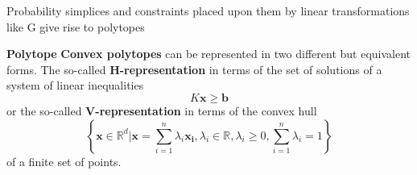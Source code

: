 \begin{frame}
Probability simplices and constraints placed upon them by linear transformations like G give rise to polytopes
\begin{block}{\textbf{Polytope}}
\textbf{Convex polytopes} can be represented in two different but equivalent forms. The so-called \textbf{H-representation} in terms of the set of solutions of a system of linear inequalities
$$K\mathbf{x} \geq \mathbf{b}$$
or the so-called \textbf{V-representation} in terms of the convex hull
$$\left\{ \mathbf{x} \in \mathbb{R}^d | \mathbf{x} = \sum_{i=1}^n \lambda_i \mathbf{x_i}, \lambda_i \in \mathbb{R}, \lambda_i \geq 0, \sum_{i=1}^n \lambda_i = 1  \right\} $$
of a finite set of points.
\end{block}
\end{frame}
